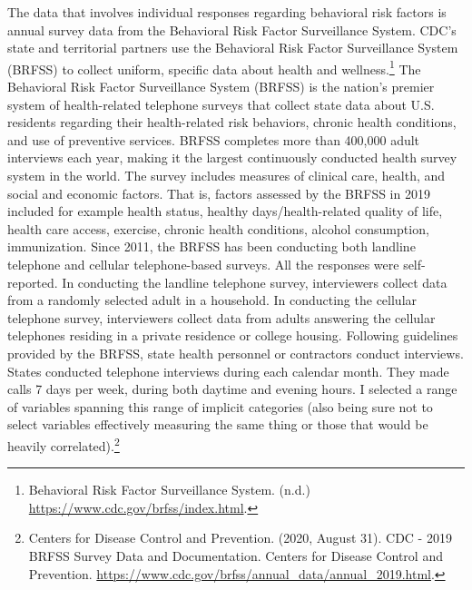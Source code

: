 \documentclass[
]{article}
\begin{document}
The data that involves individual responses regarding behavioral risk factors is annual survey data from the Behavioral Risk Factor Surveillance System. CDC's state and territorial partners use the Behavioral Risk Factor Surveillance System (BRFSS) to collect uniform, specific data about health and wellness.\footnote{Behavioral Risk Factor Surveillance System. (n.d.) \url{https://www.cdc.gov/brfss/index.html}.} The Behavioral Risk Factor Surveillance System (BRFSS) is the nation's premier system of health-related telephone surveys that collect state data about U.S. residents regarding their health-related risk behaviors, chronic health conditions, and use of preventive services. BRFSS completes more than 400,000 adult interviews each year, making it the largest continuously conducted health survey system in the world. The survey includes measures of clinical care, health, and social and economic factors. That is, factors assessed by the BRFSS in 2019 included for example health status, healthy days/health-related quality of life, health care access, exercise, chronic health conditions, alcohol consumption, immunization. Since 2011, the BRFSS has been conducting both landline telephone and cellular telephone-based surveys. All the responses were self-reported. In conducting the landline telephone survey, interviewers collect data from a randomly selected adult in a household. In conducting the cellular telephone survey, interviewers collect data from adults answering the cellular telephones residing in a private residence or college housing. Following guidelines provided by the BRFSS, state health personnel or contractors conduct interviews. States conducted telephone interviews during each calendar month. They made calls 7 days per week, during both daytime and evening hours. I selected a range of variables spanning this range of implicit categories (also being sure not to select variables effectively measuring the same thing or those that would be heavily correlated).\footnote{Centers for Disease Control and Prevention. (2020, August 31). CDC - 2019 BRFSS Survey Data and Documentation. Centers for Disease Control and Prevention. \url{https://www.cdc.gov/brfss/annual_data/annual_2019.html}.}
\end{document}
